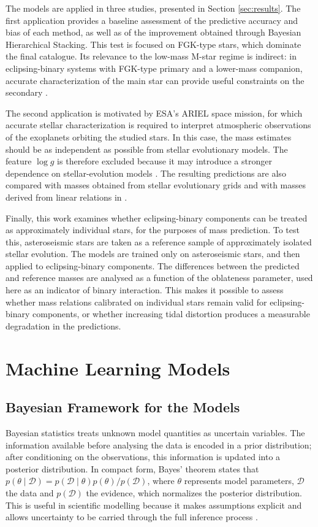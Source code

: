 The models are applied in three studies, presented in Section \ref{sec:results}. The first application provides a baseline assessment of the predictive accuracy and bias of each method, as well as of the improvement obtained through Bayesian Hierarchical Stacking. This test is focused on FGK-type stars, which dominate the final catalogue. Its relevance to the low-mass M-star regime is indirect: in eclipsing-binary systems with FGK-type primary and a lower-mass companion, accurate characterization of the main star can provide useful constraints on the secondary \citep{maxted2023benchmark}.

The second application is motivated by ESA's ARIEL space mission, for which accurate stellar characterization is required to interpret atmospheric observations of the exoplanets orbiting the studied stars. In this case, the mass estimates should be as independent as possible from stellar evolutionary models. The feature $\log g$ is therefore excluded because it may introduce a stronger dependence on stellar-evolution models \citep{tsantaki2018,Serenelli2021}. The resulting predictions are also compared with masses obtained from stellar evolutionary grids and with masses derived from linear relations in \citet{moya2018}.

Finally, this work examines whether eclipsing-binary components can be treated as approximately individual stars, for the purposes of mass prediction. To test this, asteroseismic stars are taken as a reference sample of approximately isolated stellar evolution. The models are trained only on asteroseismic stars, and then applied to eclipsing-binary components. The differences between the predicted and reference masses are analysed as a function of the oblateness parameter, used here as an indicator of binary interaction. This makes it possible to assess whether mass relations calibrated on individual stars remain valid for eclipsing-binary components, or whether increasing tidal distortion produces a measurable degradation in the predictions.

\section{Machine Learning Models} \label{sec:models}

\subsection{Bayesian Framework for the Models} \label{sec:bayesian-inference}
Bayesian statistics treats unknown model quantities as uncertain variables. The information available before analysing the data is encoded in a prior distribution; after conditioning on the observations, this information is updated into a posterior distribution. In compact form, Bayes' theorem states that $p(\theta \mid \mathcal{D}) = p(\mathcal{D} \mid \theta)p(\theta)/p(\mathcal{D})$, where $\theta$ represents model parameters, $\mathcal{D}$ the data and $p(\mathcal{D})$ the evidence, which normalizes the posterior distribution. This is useful in scientific modelling because it makes assumptions explicit and allows uncertainty to be carried through the full inference process \citep{mcelreath2020rethinking}.

